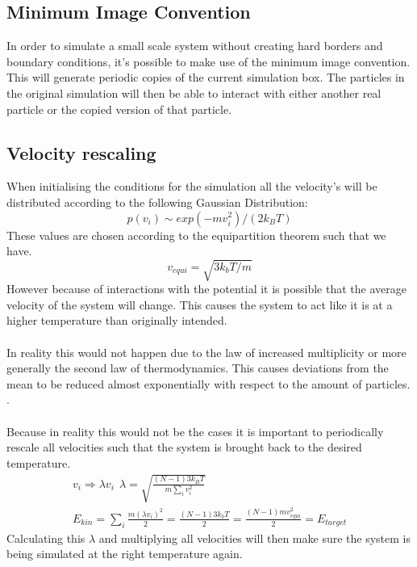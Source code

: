 \documentclass[a4paper,12pt]{article} %
\begin{document}
\subsection{Minimum Image Convention}
In order to simulate a small scale system without creating hard borders and boundary conditions, it's possible to make use of the minimum image convention. This will generate periodic copies of the current simulation box. The particles in the original simulation will then be able to interact with either another real particle or the copied version of that particle.\cite{braun2019best}
\subsection{Velocity rescaling}
When initialising the conditions for the simulation all the velocity's will be distributed according to the following Gaussian Distribution:
\begin{equation}
    p(v_i) \sim exp{ (-mv^2_i)/(2k_BT)}
\end{equation}
These values are chosen according to the equipartition theorem such that we have.
\begin{equation}
    v_{equi}= \sqrt{3k_bT/m}
\end{equation}
However because of interactions with the potential it is possible that the average velocity of the system will change. This causes the system to act like it is at a higher temperature than originally intended.\\
\\
In reality this would not happen due to the law of increased multiplicity or more generally the second law of thermodynamics. This causes deviations from the mean to be reduced almost exponentially with respect to the amount of particles. \cite{Pearson}.\\
\\
Because in reality this would not be the cases it is important to periodically rescale all velocities such that the system is brought back to the desired temperature.
\begin{equation}
\begin{gathered}
 v_i \Rightarrow \lambda v_i \ \ \lambda = \sqrt{\frac{(N-1)3k_BT}{m\sum_iv^2_i}} \\
    E_{kin} = \sum_i \frac{m(\lambda v_i)^2}{2}  =\frac{(N-1)3k_bT}{2} = \frac{(N-1)mv^2_{equi}}{2} = E_{target}
\end{gathered}
\end{equation}
Calculating this $\lambda$ and multiplying all velocities will then make sure the system is being simulated at the right temperature again. 
\end{document}
